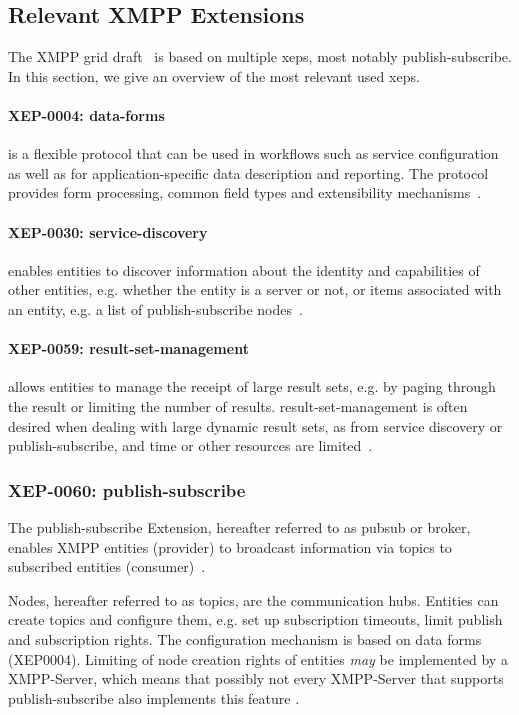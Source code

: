 \subsection{Relevant XMPP Extensions}

The XMPP grid draft~\cite{ietf-mile-xmpp-grid-05} is based on multiple \glspl{xep}, most notably \gls{publish-subscribe}. In this section, we give an overview of the most relevant used \glspl{xep}.

\paragraph{XEP-0004: \gls{data-forms}} is a flexible protocol that can be used in workflows such as service configuration as well as for application-specific data description and reporting. The protocol provides form processing, common field types and extensibility mechanisms~\cite{xep-0004}.

\paragraph{XEP-0030: \gls{service-discovery}} enables entities to discover information about the identity and capabilities of other entities, e.g. whether the entity is a server or not, or items associated with an entity, e.g. a list of \gls{publish-subscribe} nodes~\cite{xep-0030}.

\paragraph{XEP-0059: \Gls{result-set-management}} allows entities to manage the receipt of large result sets, e.g. by paging through the result or limiting the number of results. \gls{result-set-management} is often desired when dealing with large dynamic result sets, as from service discovery or publish-subscribe, and time or other resources are limited~\cite{xep-0059}.

\subsubsection{XEP-0060: \Gls{publish-subscribe}}
The \gls{publish-subscribe} Extension, hereafter referred to as \gls{pubsub} or \gls{broker}, enables XMPP entities (\gls{provider}) to broadcast information via \glspl{topic} to subscribed entities (\gls{consumer})~\cite{xep-0060}.

Nodes, hereafter referred to as \glspl{topic}, are the communication hubs. Entities can create topics and configure them, e.g. set up subscription timeouts, limit publish and subscription rights. The configuration mechanism is based on data forms (XEP0004). Limiting of node creation rights of entities \emph{may} be implemented by a XMPP-Server, which means that possibly not every XMPP-Server that supports \gls{publish-subscribe} also implements this feature \cite{rfc2119}.

